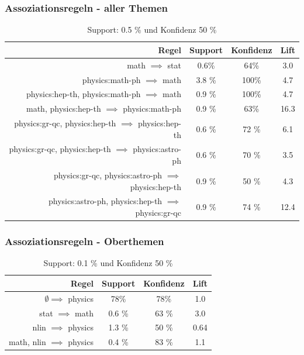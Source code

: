 \documentclass[12pt, xcolor=table]{beamer}
\begin{document}
\begin{frame}
	\frametitle{Assoziationsregeln - aller Themen}
	\begin{center}
	\begin{table}
	\begin{tabular}{rccc}
		\tiny\textbf{Regel} &\tiny \textbf{Support} &\tiny \textbf{Konfidenz} & \tiny \textbf{Lift}\\
		\hline
		\tiny math $\implies$ stat & \tiny 0.6\% &\tiny 64\% &\tiny 3.0  \\
		\tiny physics:math-ph $\implies$ math &\tiny 3.8 \% &\tiny 100\% &\tiny 4.7 \\
		\tiny physics:hep-th, physics:math-ph  $\implies$ math &\tiny 0.9 \% &\tiny 100\% &\tiny 4.7 \\
		\tiny math, physics:hep-th  $\implies$ physics:math-ph  &\tiny 0.9 \% &\tiny 63\% &\tiny 16.3 \\
		\tiny physics:gr-qc, physics:hep-th $\implies$ physics:hep-th &\tiny 0.6 \% &\tiny 72 \% &\tiny 6.1 \\
		\tiny physics:gr-qc, physics:hep-th $\implies$ physics:astro-ph &\tiny 0.6 \% &\tiny 70 \% &\tiny 3.5 \\
		\tiny physics:gr-qc, physics:astro-ph $\implies$ physics:hep-th &\tiny 0.9 \% &\tiny 50 \%  &\tiny 4.3 \\
		\tiny physics:astro-ph, physics:hep-th $\implies$ physics:gr-qc  &\tiny 0.9 \% &\tiny 74 \% &\tiny 12.4 \\
	\end{tabular}
	 \caption*{Support: 0.5 \% und Konfidenz 50 \%}
	\end{table}
	\end{center}
\end{frame}
\begin{frame}
	\frametitle{Assoziationsregeln - Oberthemen}
	\begin{center}
	\begin{table}
	\begin{tabular}{rccc}
		\tiny\textbf{Regel} &\tiny \textbf{Support} &\tiny \textbf{Konfidenz} & \tiny \textbf{Lift}\\
		\hline
		\tiny  $\emptyset \implies$ physics & \tiny 78\% &\tiny 78\% &\tiny 1.0  \\
		\tiny stat $\implies$ math  &\tiny 0.6 \% &\tiny 63 \% &\tiny 3.0 \\
		\tiny nlin $\implies$ physics  &\tiny 1.3 \% &\tiny 50 \% &\tiny 0.64 \\
		\tiny math, nlin $\implies$ physics  &\tiny 0.4 \% &\tiny 83 \% &\tiny 1.1 \\
	\end{tabular}
	 \caption*{Support: 0.1 \% und Konfidenz 50 \%}
	\end{table}
	\end{center}
\end{frame}
\end{document}
